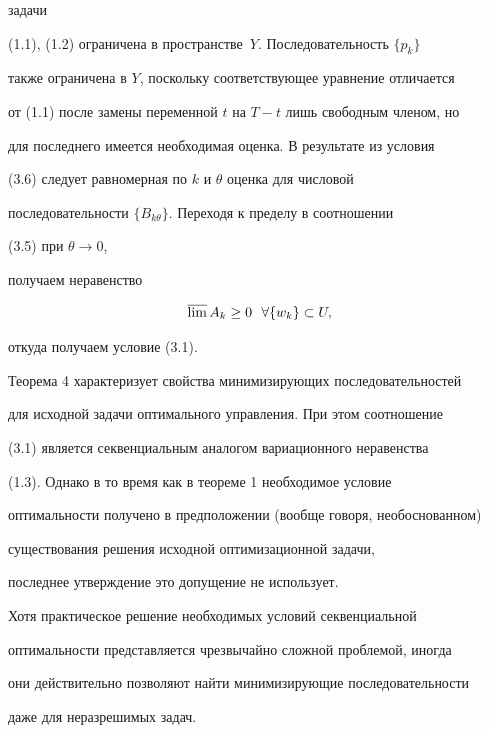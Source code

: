 \begin{pf}
задачи 


(1.1), (1.2) ограничена в пространстве~$Y$. Последовательность $\{p_k\}$ 


также ограничена в $Y$, поскольку соответствующее уравнение отличается 


от (1.1) после замены переменной $t$ на $T-t$ лишь свободным членом, но 


для последнего имеется необходимая оценка. В результате из условия 


(3.6) следует равномерная по $k$ и $\theta$ оценка для числовой 


последовательности $\{B_{k\theta}\}$. Переходя к пределу в соотношении 


(3.5) при $\theta\to0$, 


получаем неравенство 


$$ 


\varlimsup A_k\ge0\ \ \forall\{w_k\}\subset U, 


$$ 


откуда получаем условие (3.1). 


\end{pf} 


 


Теорема 4 характеризует свойства минимизирующих последовательностей 


для исходной задачи оптимального управления. При этом соотношение 


(3.1) является секвенциальным аналогом вариационного неравенства 


(1.3). Однако в то время как в теореме 1 необходимое условие 


оптимальности получено в предположении (вообще говоря, необоснованном) 


существования решения исходной оптимизационной задачи, 


последнее утверждение это допущение не использует. 


 


Хотя практическое решение необходимых условий секвенциальной 


оптимальности представляется чрезвычайно сложной проблемой, иногда 


они действительно позволяют найти минимизирующие последовательности 


даже для неразрешимых задач. 


 


 


